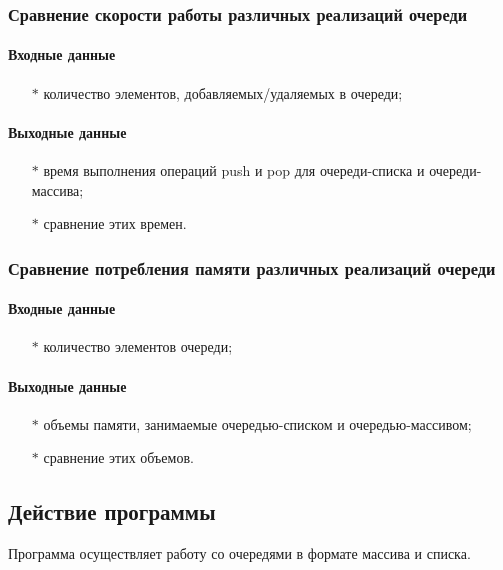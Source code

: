 \documentclass[a4paper,12pt]{extarticle}
\begin{document}
\subsubsection{Сравнение скорости работы различных реализаций очереди}

\paragraph{Входные данные}
\begin{itemize}
    \item[$*$] количество элементов, добавляемых/удаляемых в очереди;
\end{itemize}

\paragraph{Выходные данные}
\begin{itemize}
    \item[$*$] время выполнения операций push и pop для очереди-списка и очереди-массива;
    \item[$*$] сравнение этих времен.
\end{itemize}

\subsubsection{Сравнение потребления памяти различных реализаций очереди}

\paragraph{Входные данные}
\begin{itemize}
    \item[$*$] количество элементов очереди;
\end{itemize}

\paragraph{Выходные данные}
\begin{itemize}
    \item[$*$] объемы памяти, занимаемые очередью-списком и очередью-массивом;
    \item[$*$] сравнение этих объемов.
\end{itemize}


\subsection{Действие программы}
Программа осуществляет работу со очередями в формате массива и списка.
\end{document}
